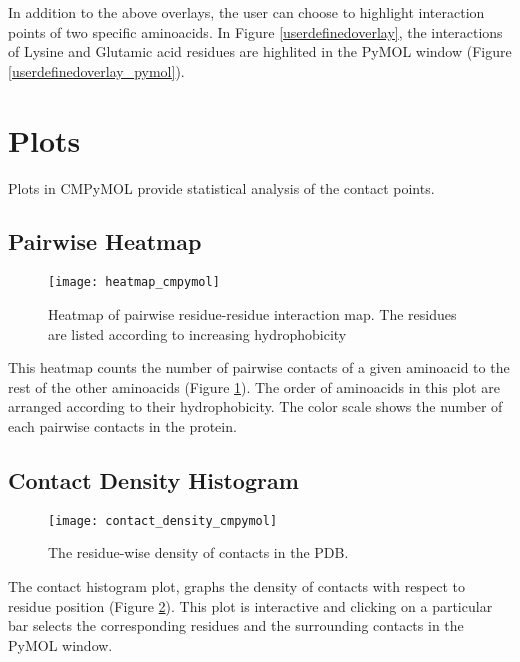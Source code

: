 \documentclass[11pt,fleqn]{book} %
\begin{document}
In addition to the above overlays, the user can choose to highlight interaction points of two specific aminoacids. In Figure \ref{userdefinedoverlay}, the interactions of Lysine and Glutamic acid residues are highlited in the PyMOL window (Figure \ref{userdefinedoverlay_pymol}).

\section{Plots}

Plots in CMPyMOL provide statistical analysis of the contact points.

\subsection{Pairwise Heatmap}

\begin{figure}[ht!]
\centering
  \begin{minipage}{\textwidth}
  \centering
      \texttt{[image: heatmap\_cmpymol]}
      \caption{Heatmap of pairwise residue-residue interaction map. The residues are listed according to increasing hydrophobicity}
  \label{heatmap}
  \end{minipage}
\end{figure}

This heatmap counts the number of pairwise contacts of a given aminoacid to the rest of the other aminoacids (Figure \ref{heatmap}). The order of aminoacids in this plot are arranged according to their hydrophobicity. The color scale shows the number of each pairwise contacts in the protein.

\subsection{Contact Density Histogram}

\begin{figure}[ht!]
\centering
  \begin{minipage}{\textwidth}
  \centering
      \texttt{[image: contact\_density\_cmpymol]}
      \caption{The residue-wise density of contacts in the PDB.}
  \label{contactdensity}
  \end{minipage}
\end{figure}

The contact histogram plot, graphs the density of contacts with respect to residue position (Figure \ref{contactdensity}). This plot is interactive and clicking on a particular bar selects the corresponding residues and the surrounding contacts in the PyMOL window.
\end{document}

